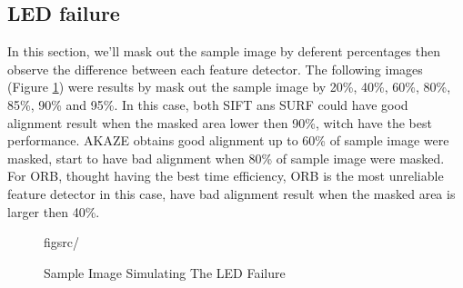 	\subsection{LED failure}
		In this section, we'll mask out the sample image by deferent percentages then observe the difference between each feature detector.
		The following images (Figure \ref{fig:testSamplesOfMaskOut}) were results by mask out the sample image by 20\%, 40\%, 60\%, 80\%, 85\%, 90\% and 95\%.
		In this case, both SIFT ans SURF could have good alignment result when the masked area lower then 90\%, witch have the best performance.
		AKAZE obtains good alignment up to 60\% of sample image were masked, start to have bad alignment when 80\% of sample image were masked.
		For ORB, thought having the best time efficiency, ORB is the most unreliable feature detector in this case, have bad alignment result when the masked area is larger then 40\%.
		\begin{figure}[H]
			\caption{Sample Image Simulating The LED Failure}
			\label{fig:testSamplesOfMaskOut}
figsrc/		\end{figure}
